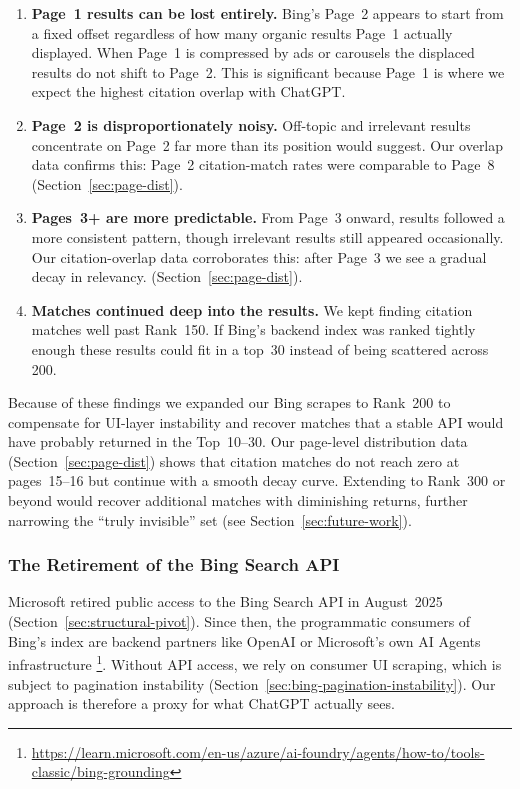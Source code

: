 \begin{enumerate}
    \item \textbf{Page~1 results can be lost entirely.} Bing's Page~2 appears to start from a fixed offset regardless of how many organic results Page~1 actually displayed. When Page~1 is compressed by ads or carousels the displaced results do not shift to Page~2. This is significant because Page~1 is where we expect the highest citation overlap with ChatGPT.
    \item \textbf{Page~2 is disproportionately noisy.} Off-topic and irrelevant results concentrate on Page~2 far more than its position would suggest. Our overlap data confirms this: Page~2 citation-match rates were comparable to Page~8 (Section~\ref{sec:page-dist}).
    \item \textbf{Pages~3+ are more predictable.} From Page~3 onward, results followed a more consistent pattern, though irrelevant results still appeared occasionally. Our citation-overlap data corroborates this: after Page~3 we see a gradual decay in relevancy. (Section~\ref{sec:page-dist}).
    \item \textbf{Matches continued deep into the results.} We kept finding citation matches well past Rank~150.
    If Bing's backend index was ranked tightly enough these results could fit in a top~30 instead of being scattered across 200.
\end{enumerate}

Because of these findings we expanded our Bing scrapes to Rank~200 to compensate for UI-layer instability and
 recover matches that a stable API would have probably returned in the Top~10--30. Our page-level distribution data (Section~\ref{sec:page-dist}) shows
 that citation matches do not reach zero at pages~15--16 but continue with a smooth decay curve. 
Extending to Rank~300 or beyond would recover additional matches with diminishing returns, further narrowing the ``truly invisible'' set (see Section~\ref{sec:future-work}).

\subsubsection{The Retirement of the Bing Search API}

Microsoft retired public access to the Bing Search API in August~2025
(Section~\ref{sec:structural-pivot}). Since then, the programmatic consumers of
Bing's index are backend partners like OpenAI or Microsoft's own AI Agents infrastructure
 \footnote{\url{https://learn.microsoft.com/en-us/azure/ai-foundry/agents/how-to/tools-classic/bing-grounding}}.
  Without API access, we rely on consumer UI scraping, which is subject to pagination instability (Section~\ref{sec:bing-pagination-instability}).
   Our approach is therefore a proxy for what ChatGPT actually sees. 
